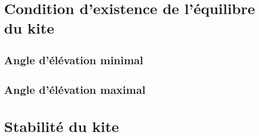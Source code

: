 \section{\textbf{Condition d'existence de l'équilibre du kite}} 
\label{sec:Ch1.3}

\subsection{Angle d'élévation minimal} 
\label{sec:Ch1.3.1}

\subsection{Angle d'élévation maximal}
\label{sec:Ch1.3.2}


\section{\textbf{Stabilité du kite}} 
\label{sec:Ch1.4}